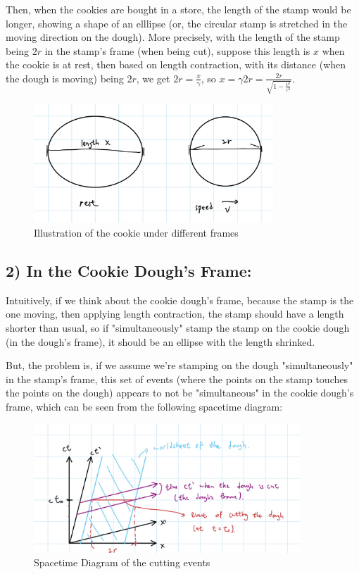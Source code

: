 \documentclass{article}
\begin{document}
Then, when the cookies are bought in a store, the length of the stamp would be longer, showing a shape of an elllipse (or, the circular stamp is stretched in the moving direction on the dough). More precisely, with the length of the stamp being $2r$ in the stamp's frame (when being cut), suppose this length is $x$ when the cookie is at rest, then based on length contraction, with its distance (when the dough is moving) being $2r$, we get $2r = \frac{x}{\gamma}$, so $x = \gamma 2r = \frac{2r}{\sqrt{1-\frac{v^2}{c^2}}}$.

\begin{figure}[h!]
    \begin{center}
        \includegraphics[width=90mm]{hw4 q31.jpg}
        \caption{Illustration of the cookie under different frames}
    \end{center}
\end{figure}

\subsection*{2) In the Cookie Dough's Frame:}
Intuitively, if we think about the cookie dough's frame, because the stamp is the one moving, then applying length contraction, the stamp should have a length shorter than usual, so if "simultaneously" stamp the stamp on the cookie dough (in the dough's frame), it should be an ellipse with the length shrinked.

But, the problem is, if we assume we're stamping on the dough "simultaneously" in the stamp's frame, this set of events (where the points on the stamp touches the points on the dough) appears to not be "simultaneous" in the cookie dough's frame, which can be seen from the following spacetime diagram:

\begin{figure}[h!]
    \begin{center}
        \includegraphics[width=100mm]{hw4 q32.jpg}
        \caption{Spacetime Diagram of the cutting events}
    \end{center}
\end{figure}
\end{document}
